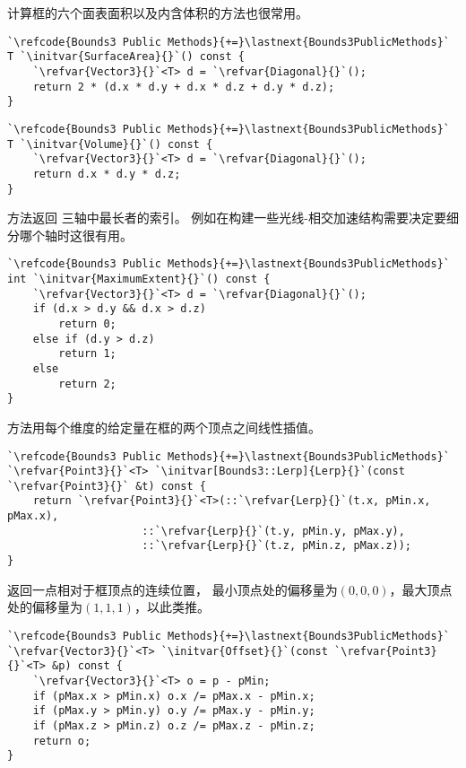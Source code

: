 计算框的六个面表面积以及内含体积的方法也很常用。
\begin{lstlisting}
`\refcode{Bounds3 Public Methods}{+=}\lastnext{Bounds3PublicMethods}`
T `\initvar{SurfaceArea}{}`() const {
    `\refvar{Vector3}{}`<T> d = `\refvar{Diagonal}{}`();
    return 2 * (d.x * d.y + d.x * d.z + d.y * d.z);
}
\end{lstlisting}

\begin{lstlisting}
`\refcode{Bounds3 Public Methods}{+=}\lastnext{Bounds3PublicMethods}`
T `\initvar{Volume}{}`() const {
    `\refvar{Vector3}{}`<T> d = `\refvar{Diagonal}{}`();
    return d.x * d.y * d.z;
}
\end{lstlisting}

方法返回
三轴中最长者的索引。
例如在构建一些光线-相交加速结构需要决定要细分哪个轴时这很有用。
\begin{lstlisting}
`\refcode{Bounds3 Public Methods}{+=}\lastnext{Bounds3PublicMethods}`
int `\initvar{MaximumExtent}{}`() const {
    `\refvar{Vector3}{}`<T> d = `\refvar{Diagonal}{}`();
    if (d.x > d.y && d.x > d.z)
        return 0;
    else if (d.y > d.z)
        return 1;
    else
        return 2;
}
\end{lstlisting}

方法用每个维度的给定量在框的两个顶点之间线性插值。
\begin{lstlisting}
`\refcode{Bounds3 Public Methods}{+=}\lastnext{Bounds3PublicMethods}`
`\refvar{Point3}{}`<T> `\initvar[Bounds3::Lerp]{Lerp}{}`(const `\refvar{Point3}{}` &t) const {
    return `\refvar{Point3}{}`<T>(::`\refvar{Lerp}{}`(t.x, pMin.x, pMax.x),
                     ::`\refvar{Lerp}{}`(t.y, pMin.y, pMax.y),
                     ::`\refvar{Lerp}{}`(t.z, pMin.z, pMax.z));
}
\end{lstlisting}

返回一点相对于框顶点的连续位置，
最小顶点处的偏移量为$(0,0,0)$，最大顶点处的偏移量为$(1,1,1)$，以此类推。
\begin{lstlisting}
`\refcode{Bounds3 Public Methods}{+=}\lastnext{Bounds3PublicMethods}`
`\refvar{Vector3}{}`<T> `\initvar{Offset}{}`(const `\refvar{Point3}{}`<T> &p) const {
    `\refvar{Vector3}{}`<T> o = p - pMin;
    if (pMax.x > pMin.x) o.x /= pMax.x - pMin.x;
    if (pMax.y > pMin.y) o.y /= pMax.y - pMin.y;
    if (pMax.z > pMin.z) o.z /= pMax.z - pMin.z;
    return o;
}
\end{lstlisting}

